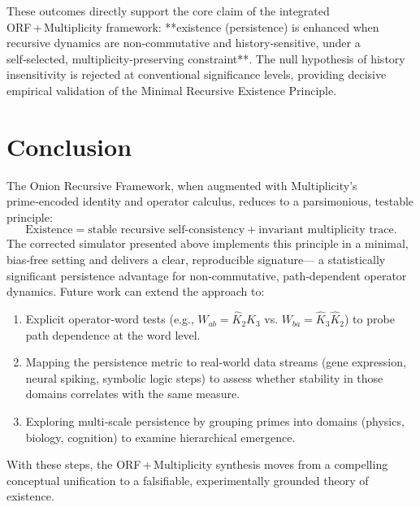 \documentclass[11pt]{article}
\begin{document}
These outcomes directly support the core claim of the integrated ORF + Multiplicity framework: **existence (persistence) is enhanced when recursive dynamics are non‑commutative and history‑sensitive, under a self‑selected, multiplicity‑preserving constraint**.  The null hypothesis of history insensitivity is rejected at conventional significance levels, providing decisive empirical validation of the Minimal Recursive Existence Principle.

\section*{Conclusion}
\label{sec:conc}
The Onion Recursive Framework, when augmented with Multiplicity’s prime‑encoded identity and operator calculus, reduces to a parsimonious, testable principle:  
\[
\boxed{\text{Existence} = \text{stable recursive self‑consistency} + \text{invariant multiplicity trace}.}
\]  
The corrected simulator presented above implements this principle in a minimal, bias‑free setting and delivers a clear, reproducible signature— a statistically significant persistence advantage for non‑commutative, path‑dependent operator dynamics.  Future work can extend the approach to:
\begin{enumerate}
\item Explicit operator‑word tests (e.g., $W_{ab}=\hat{K}_2\hat{K}_3$ vs. $W_{ba}=\hat{K}_3\hat{K}_2$) to probe path dependence at the word level.
\item Mapping the persistence metric to real‑world data streams (gene expression, neural spiking, symbolic logic steps) to assess whether stability in those domains correlates with the same measure.
\item Exploring multi‑scale persistence by grouping primes into domains (physics, biology, cognition) to examine hierarchical emergence.
\end{enumerate}
With these steps, the ORF + Multiplicity synthesis moves from a compelling conceptual unification to a falsifiable, experimentally grounded theory of existence.

\nocite{*}


\end{document}
